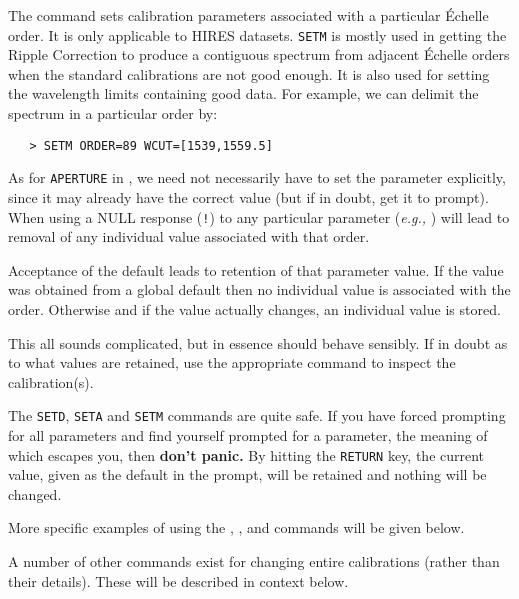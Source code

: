 The 
 command sets calibration parameters associated with a particular
\'{E}chelle order.  It is only applicable to HIRES datasets.  \verb+SETM+ is
mostly used in getting the Ripple Correction to produce a contiguous spectrum
from adjacent \'{E}chelle orders when the standard calibrations are not good
enough.  It is also used for setting the wavelength limits containing good data.
For example, we can delimit the spectrum in a particular order by:

\begin{verbatim}
   > SETM ORDER=89 WCUT=[1539,1559.5]
\end{verbatim}

As for \verb+APERTURE+ in 
, we need not necessarily have to set the
 parameter explicitly, since it may already have the correct value
(but if in doubt, get it to prompt)\@.  When using
 a NULL response
(\verb+!+) to any particular parameter ({\it{e.g.,}}
) will lead to
removal of any individual value associated with that order.

Acceptance of the default leads to retention of that parameter value. If the
value was obtained from a global default then no individual value is associated
with the order.  Otherwise and if the value actually changes, an individual
value is stored.

This all sounds complicated, but in essence should behave sensibly.  If in
doubt as to what values are retained, use the appropriate
 command to inspect the calibration(s).

The \verb+SETD+, \verb+SETA+ and \verb+SETM+ commands are quite safe.  If you
have forced prompting for all parameters and find yourself prompted for a
parameter, the meaning of which escapes you, then {\bf don't panic.}  By
hitting the \verb+RETURN+ key, the current value, given as the default in the
prompt, will be retained and nothing will be changed.

More specific examples of using the ,
, 
 and  commands will be given below.

A number of other commands exist for changing entire calibrations (rather than
their details). These will be described in context below.


